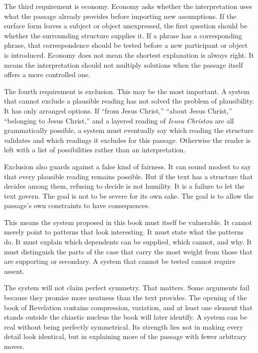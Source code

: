 The third requirement is economy. Economy asks whether the interpretation uses what the passage already provides before importing new assumptions. If the surface form leaves a subject or object unexpressed, the first question should be whether the surrounding structure supplies it. If a phrase has a corresponding phrase, that correspondence should be tested before a new participant or object is introduced. Economy does not mean the shortest explanation is always right. It means the interpretation should not multiply solutions when the passage itself offers a more controlled one.

The fourth requirement is exclusion. This may be the most important. A system that cannot exclude a plausible reading has not solved the problem of plausibility. It has only arranged options. If ``from Jesus Christ,'' ``about Jesus Christ,'' ``belonging to Jesus Christ,'' and a layered reading of \textit{Iesou Christou} are all grammatically possible, a system must eventually say which reading the structure validates and which readings it excludes for this passage. Otherwise the reader is left with a list of possibilities rather than an interpretation.

Exclusion also guards against a false kind of fairness. It can sound modest to say that every plausible reading remains possible. But if the text has a structure that decides among them, refusing to decide is not humility. It is a failure to let the text govern. The goal is not to be severe for its own sake. The goal is to allow the passage's own constraints to have consequences.

This means the system proposed in this book must itself be vulnerable. It cannot merely point to patterns that look interesting. It must state what the patterns do. It must explain which dependents can be supplied, which cannot, and why. It must distinguish the parts of the case that carry the most weight from those that are supporting or secondary. A system that cannot be tested cannot require assent.

The system will not claim perfect symmetry. That matters. Some arguments fail because they promise more neatness than the text provides. The opening of the book of Revelation contains compression, variation, and at least one element that stands outside the chiastic nucleus the book will later identify. A system can be real without being perfectly symmetrical. Its strength lies not in making every detail look identical, but in explaining more of the passage with fewer arbitrary moves.

